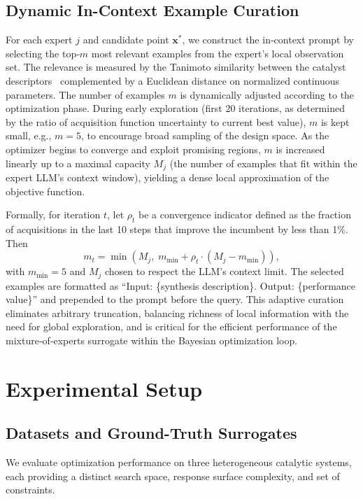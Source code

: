 \documentclass{article}
\begin{document}
\subsection{Dynamic In-Context Example Curation}
For each expert $j$ and candidate point $\mathbf{x}^*$, we construct the in‑context prompt by selecting the top‑$m$ most relevant examples from the expert’s local observation set. The relevance is measured by the Tanimoto similarity between the catalyst descriptors~\cite{willett2006similarity} complemented by a Euclidean distance on normalized continuous parameters. The number of examples $m$ is dynamically adjusted according to the optimization phase. During early exploration (first 20 iterations, as determined by the ratio of acquisition function uncertainty to current best value), $m$ is kept small, e.g., $m = 5$, to encourage broad sampling of the design space. As the optimizer begins to converge and exploit promising regions, $m$ is increased linearly up to a maximal capacity $M_j$ (the number of examples that fit within the expert LLM’s context window), yielding a dense local approximation of the objective function.

Formally, for iteration $t$, let $\rho_t$ be a convergence indicator defined as the fraction of acquisitions in the last 10 steps that improve the incumbent by less than 1\%. Then
\begin{equation}
m_t = \min\left( M_j, \; m_{\min} + \rho_t \cdot (M_j - m_{\min}) \right),
\end{equation}
with $m_{\min}=5$ and $M_j$ chosen to respect the LLM’s context limit. The selected examples are formatted as ``Input: \{synthesis description\}. Output: \{performance value\}'' and prepended to the prompt before the query. This adaptive curation eliminates arbitrary truncation, balancing richness of local information with the need for global exploration, and is critical for the efficient performance of the mixture‑of‑experts surrogate within the Bayesian optimization loop.

\section{Experimental Setup}

\subsection{Datasets and Ground-Truth Surrogates}
We evaluate optimization performance on three heterogeneous catalytic systems, each providing a distinct search space, response surface complexity, and set of constraints.
\end{document}
